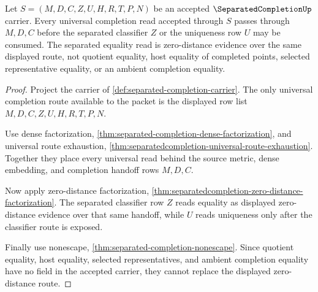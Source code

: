 \begin{theorem}
\label{thm:separatedcompletion-universal-separated-factorization}
Let $S=(M,D,C,Z,U,H,R,T,P,N)$ be an accepted $\SeparatedCompletionUp$ carrier. Every universal completion read accepted through $S$ passes through $M,D,C$ before the separated classifier $Z$ or the uniqueness row $U$ may be consumed. The separated equality read is zero-distance evidence over the same displayed route, not quotient equality, host equality of completed points, selected representative equality, or an ambient completion equality.
\end{theorem}
\begin{proof}
Project the carrier of \autoref{def:separated-completion-carrier}. The only universal completion route available to the packet is the displayed row list $M,D,C,Z,U,H,R,T,P,N$.

Use dense factorization, \autoref{thm:separated-completion-dense-factorization}, and universal route exhaustion, \autoref{thm:separatedcompletion-universal-route-exhaustion}. Together they place every universal read behind the source metric, dense embedding, and completion handoff rows $M,D,C$.

Now apply zero-distance factorization, \autoref{thm:separatedcompletion-zero-distance-factorization}. The separated classifier row $Z$ reads equality as displayed zero-distance evidence over that same handoff, while $U$ reads uniqueness only after the classifier route is exposed.

Finally use nonescape, \autoref{thm:separated-completion-nonescape}. Since quotient equality, host equality, selected representatives, and ambient completion equality have no field in the accepted carrier, they cannot replace the displayed zero-distance route.
\end{proof}


